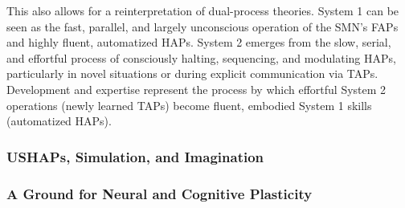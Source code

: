 This also allows for a reinterpretation of dual-process theories. System 1 can be seen as the fast, parallel, and largely unconscious operation of the SMN's FAPs and highly fluent, automatized HAPs. System 2 emerges from the slow, serial, and effortful process of consciously halting, sequencing, and modulating HAPs, particularly in novel situations or during explicit communication via TAPs. Development and expertise represent the process by which effortful System 2 operations (newly learned TAPs) become fluent, embodied System 1 skills (automatized HAPs).

\subsubsection*{USHAPs, Simulation, and Imagination}

\subsubsection*{A Ground for Neural and Cognitive Plasticity}
